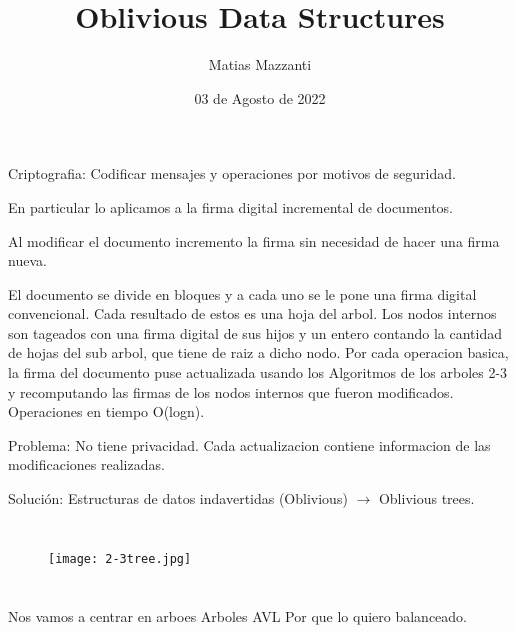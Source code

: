 \documentclass[10pt,handout]{beamer}
\title[Algoritmos y estructuras de datos 2]{Oblivious Data Structures}
\author[Matias Mazzanti]{Matias Mazzanti}
\institute{DC-UBA}
\date{03 de Agosto de 2022}
\begin{document}
\begin{frame}

\maketitle

\end{frame}

\section{}
\begin{frame}
\frametitle{}
Criptografia: Codificar mensajes y operaciones por motivos de seguridad.

En particular lo aplicamos a la firma digital incremental de documentos.

Al modificar el documento incremento la firma sin necesidad de hacer una firma nueva.


El documento se divide en bloques y a cada uno se le pone una firma digital convencional.
Cada resultado de estos es una hoja del arbol.
Los nodos internos son tageados con una firma digital de sus hijos y un entero contando
la cantidad de hojas del sub arbol, que tiene de raiz a dicho nodo.
Por cada operacion basica, la firma del documento puse actualizada usando los Algoritmos
de los arboles 2-3 y recomputando las firmas de los nodos internos que fueron modificados.
Operaciones en tiempo O(logn).

Problema: No tiene privacidad. Cada actualizacion contiene informacion de las modificaciones realizadas.

Solución: Estructuras de datos indavertidas (Oblivious) $\rightarrow$ Oblivious trees.

\end{frame}
\section{}
\begin{frame}
\frametitle{}
\begin{figure}[h!]
    \centering
    \texttt{[image: 2-3tree.jpg]}
\end{figure}


\end{frame}


\section{}
\begin{frame}
\frametitle{}
Nos vamos a centrar en arboes
Arboles AVL
Por que lo quiero balanceado.
\end{frame}
\end{document}
